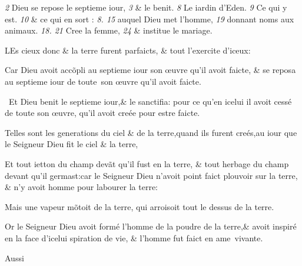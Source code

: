 \bchapter
{}
\pagestyle{scrplain}

\begin{chaptercomment}
 \emph{2} Dieu se repose le septieme iour,
 \emph{3} \& le benit.
 \emph{8} Le iardin d'Eden. \lb
 \emph{9} Ce qui y est.
 \emph{10} \& ce qui en sort :
 \emph{8. 15} auquel Dieu \lb
 met l'homme,
 \emph{19} donnant noms aux animaux.
 \emph{18. 21} Cree la \lb
 femme,
 \emph{24} \& institue le mariage.
\end{chaptercomment}

\vspace{\baselineskip}

\bversenonum \lettrine[lines=3,loversize=-0.2,lraise=0.2]{L}{}Es cieux donc \& la terre furent
parfaicts, \& tout l'exercite d'i\-ceux:

\bverse \footnotemarkmain{}Car Dieu avoit acc\~opli au septie\-me
iour son \oe{}uvre qu'il avoit faicte, \lb
\footnotemarkmain{}\& se reposa au septieme iour de tou\-te~son
\oe{}uvre qu'il avoit faicte.

\bverse Et Dieu \footnotemarkmain{}benit le septieme iour,\& le
sanctifia: pour ce qu'en icelui il avoit
cessé de toute son \oe{}uvre, qu'il avoit
creée pour estre faicte.

\bverse Telles sont les generations du ciel
\& de la terre,quand ils furent creés,au
iour que le Seigneur Dieu fit le ciel \&
la terre,

\bverse Et tout ietton du champ dev\~at qu'il
fust en la terre, \& tout herbage du
champ devant qu'il germast:car le Sei\-gneur
Dieu n'avoit point faict \footnotemarkmain{}plou\-voir
sur la terre, \& n'y avoit homme
pour labourer la terre:

\bverse Mais une vapeur m\~otoit de la terre,
qui arroisoit tout le dessus de la terre.

\bverse Or le Seigneur Dieu avoit formé
l'homme \footnotemarkmain{}de la poudre
de la terre,\footnotemarkmain{}\&
avoit inspiré en la face d'icelui spira\-tion
de vie, \& l'homme fut faict en
ame~vivante.

\vspace{-0.5cm}
\begin{flushright}
Aussi
\end{flushright}

